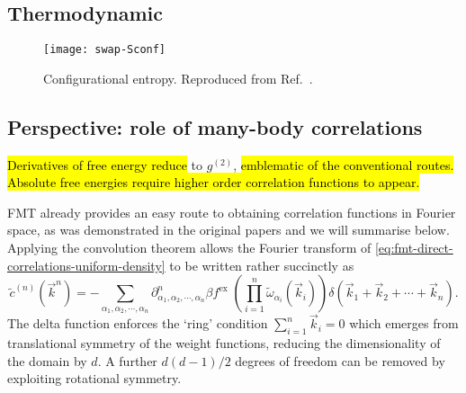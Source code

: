 \subsection{Thermodynamic }

\begin{SCfigure}
  \texttt{[image: swap-Sconf]}
  \caption[Configurational entropy in hard spheres from Monte-Carlo simulations]{
    Configurational entropy.
    Reproduced from Ref.\ \cite{BerthierPNAS2017}.
  }
\end{SCfigure}


\subsection{Perspective: role of many-body correlations}

\hl{Derivatives of free energy reduce} to $g^{(2)}$,\hl{ emblematic of the conventional routes.
Absolute free energies require higher order correlation functions to appear.}

FMT already provides an easy route to obtaining correlation functions in Fourier space, as was demonstrated in the original papers \cite{RosenfeldPRL1989,RosenfeldJCP1990} and we will summarise below.
Applying the convolution theorem allows the Fourier transform of \eqref{eq:fmt-direct-correlations-uniform-density} to be written rather succinctly as
\begin{equation}
  \tilde{c}^{(n)}(\vec{k}^n)
  =
  - \sum_{\alpha_1, \alpha_2, \cdots, \alpha_n}
  \partial^n_{\alpha_1, \alpha_2, \cdots, \alpha_n} \beta f^\mathrm{ex} \;
  \left( \prod_{i=1}^n \widetilde{\omega}_{\alpha_i}(\vec{k}_i) \right)
  \delta(\vec{k}_1 + \vec{k}_2 + \cdots + \vec{k}_n).
\end{equation}
The delta function enforces the `ring' condition $\sum_{i=1}^n \vec{k}_i = 0$ which emerges from translational symmetry of the weight functions, reducing the dimensionality of the domain by $d$.
A further $d(d-1)/2$ degrees of freedom%
can be removed by exploiting rotational symmetry.
